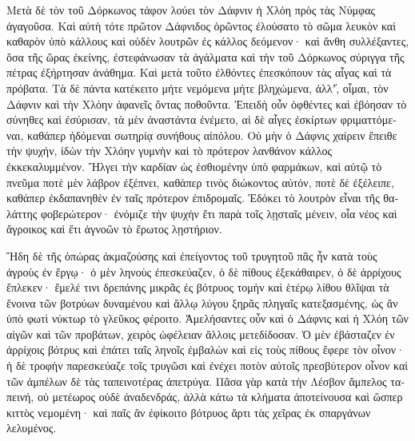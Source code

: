 \documentclass{book}
\begin{document}
\begin{pairs}
\begin{Leftside}
\begin{greek}
  Μετὰ δὲ τὸν τοῦ Δόρκωνος τάφον λούει τὸν Δάφνιν ἡ Χλόη πρὸς τὰς Νύμφας ἀγαγοῦσα. Καὶ αὐτὴ τότε πρῶτον Δάφνιδος ὁρῶντος ἐλούσατο τὸ σῶμα λευκὸν καὶ καθαρὸν ὑπὸ κάλλους καὶ οὐδὲν λουτρῶν ἐς κάλλος δεόμενον·  καὶ ἄνθη συλλέξαντες, ὅσα τῆς ὥρας ἐκείνης, ἐστεφάνωσαν τὰ ἀγάλματα καὶ τὴν τοῦ Δόρκωνος σύριγγα τῆς πέτρας ἐξήρτησαν ἀνάθημα. Καὶ μετὰ τοῦτο ἐλθόντες ἐπεσκόπουν τὰς αἶγας καὶ τὰ πρόβατα.  Τὰ δὲ πάντα κατέκειτο μήτε νεμόμενα μήτε βληχώμενα, ἀλλʼ̓, οἶμαι, τὸν Δάφνιν καὶ τὴν Χλόην ἀφανεῖς ὄντας ποθοῦντα. Ἐπειδὴ οὖν ὀφθέντες καὶ ἐβόησαν τὸ σύνηθες καὶ ἐσύρισαν, τὰ μὲν ἀναστάντα ἐνέμετο, αἱ δὲ αἶγες ἐσκίρτων φριματτόμεναι, καθάπερ ἡδόμεναι σωτηρίᾳ συνήθους αἰπόλου.  Οὐ μὴν ὁ Δάφνις χαίρειν ἔπειθε τὴν ψυχήν, ἰδὼν τὴν Χλόην γυμνὴν καὶ τὸ πρότερον λανθάνον κάλλος ἐκκεκαλυμμένον. Ἤλγει τὴν καρδίαν ὡς ἐσθιομένην ὑπὸ φαρμάκων, καὶ αὐτῷ τὸ πνεῦμα ποτὲ μὲν λάβρον ἐξέπνει, καθάπερ τινὸς διώκοντος αὐτόν, ποτὲ δὲ ἐξέλειπε, καθάπερ ἐκδαπανηθὲν ἐν ταῖς πρότερον ἐπιδρομαῖς.  Ἐδόκει τὸ λουτρὸν εἶναι τῆς θαλάττης φοβερώτερον· ἐνόμιζε τὴν ψυχὴν ἔτι παρὰ τοῖς λῃσταῖς μένειν, οἷα νέος καὶ ἄγροικος καὶ ἔτι ἀγνοῶν τὸ ἔρωτος λῃστήριον.
\pend


  Ἤδη δὲ τῆς ὀπώρας ἀκμαζούσης καὶ ἐπείγοντος τοῦ τρυγητοῦ πᾶς ἦν κατὰ τοὺς ἀγροὺς ἐν ἔργῳ· ὁ μὲν ληνοὺς ἐπεσκεύαζεν, ὁ δὲ πίθους ἐξεκάθαιρεν, ὁ δὲ ἀρρίχους ἔπλεκεν·  ἔμελέ τινι δρεπάνης μικρᾶς ἐς βότρυος τομὴν καὶ ἑτέρῳ λίθου θλῖψαι τὰ ἔνοινα τῶν βοτρύων δυναμένου καὶ ἄλλῳ λύγου ξηρᾶς πληγαῖς κατεξασμένης, ὡς ἂν ὑπὸ φωτὶ νύκτωρ τὸ γλεῦκος φέροιτο.  Ἀμελήσαντες οὖν καὶ ὁ Δάφνις καὶ ἡ Χλόη τῶν αἰγῶν καὶ τῶν προβάτων, χειρὸς ὠφέλειαν ἄλλοις μετεδίδοσαν. Ὁ μὲν ἐβάσταζεν ἐν ἀρρίχοις βότρυς καὶ ἐπάτει ταῖς ληνοῖς ἐμβαλὼν καὶ εἰς τοὺς πίθους ἔφερε τὸν οἶνον· ἡ δὲ τροφὴν παρεσκεύαζε τοῖς τρυγῶσι καὶ ἐνέχει ποτὸν αὐτοῖς πρεσβύτερον οἶνον καὶ τῶν ἀμπέλων δὲ τὰς ταπεινοτέρας ἀπετρύγα.  Πᾶσα γὰρ κατὰ τὴν Λέσβον ἄμπελος ταπεινή, οὐ μετέωρος οὐδὲ ἀναδενδράς, ἀλλὰ κάτω τὰ κλήματα ἀποτείνουσα καὶ ὥσπερ κιττὸς νεμομένη· καὶ παῖς ἂν ἐφίκοιτο βότρυος ἄρτι τὰς χεῖρας ἐκ σπαργάνων λελυμένος.
\pend



\end{greek}
\end{Leftside}
\end{pairs}
\end{document}
